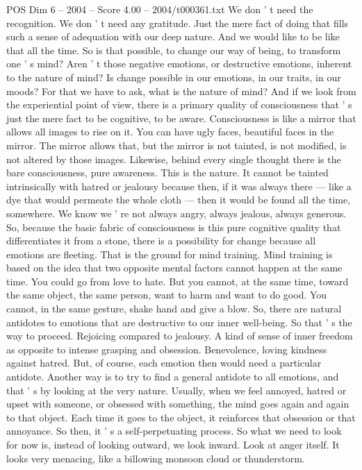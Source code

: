 \begin{textsample}{POS Dim 6 – 2004 – Score 4.00 – 2004/t000361.txt}
We don ' t need the recognition.
We don ' t need any gratitude.
Just the mere fact of doing that fills such a sense of adequation with our deep nature.
And we would like to be like that all the time.
So is that possible, to change our way of being, to transform one ' s mind?
Aren ' t those negative emotions, or destructive emotions, inherent to the nature of mind?
Is change possible in our emotions, in our traits, in our moods?
For that we have to ask, what is the nature of mind?
And if we look from the experiential point of view, there is a primary quality of consciousness that ' s just the mere fact to be cognitive, to be aware.
Consciousness is like a mirror that allows all images to rise on it.
You can have ugly faces, beautiful faces in the mirror.
The mirror allows that, but the mirror is not tainted, is not modified, is not altered by those images.
Likewise, behind every single thought there is the bare consciousness, pure awareness.
This is the nature.
It cannot be tainted intrinsically with hatred or jealousy because then, if it was always there — like a dye that would permeate the whole cloth — then it would be found all the time, somewhere.
We know we ' re not always angry, always jealous, always generous.
So, because the basic fabric of consciousness is this pure cognitive quality that differentiates it from a stone, there is a possibility for change because all emotions are fleeting.
That is the ground for mind training.
Mind training is based on the idea that two opposite mental factors cannot happen at the same time.
You could go from love to hate.
But you cannot, at the same time, toward the same object, the same person, want to harm and want to do good.
You cannot, in the same gesture, shake hand and give a blow.
So, there are natural antidotes to emotions that are destructive to our inner well-being.
So that ' s the way to proceed.
Rejoicing compared to jealousy.
A kind of sense of inner freedom as opposite to intense grasping and obsession.
Benevolence, loving kindness against hatred.
But, of course, each emotion then would need a particular antidote.
Another way is to try to find a general antidote to all emotions, and that ' s by looking at the very nature.
Usually, when we feel annoyed, hatred or upset with someone, or obsessed with something, the mind goes again and again to that object.
Each time it goes to the object, it reinforces that obsession or that annoyance.
So then, it ' s a self-perpetuating process.
So what we need to look for now is, instead of looking outward, we look inward.
Look at anger itself.
It looks very menacing, like a billowing monsoon cloud or thunderstorm.

\end{textsample}
